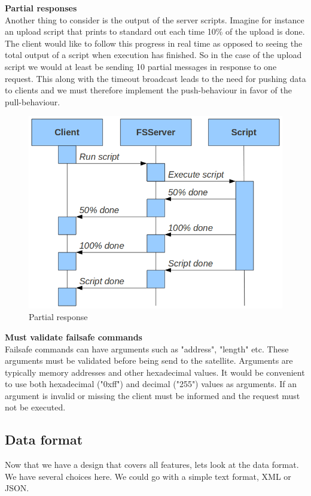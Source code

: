 \textbf{Partial responses} \\
Another thing to consider is the output of the server scripts. Imagine for instance an upload script that prints to standard out each time 10\% of the upload is done. The client would like to follow this progress in real time as opposed to seeing the total output of a script when execution has finished. So in the case of the upload script we would at least be sending 10 partial messages in response to one request.
This along with the timeout broadcast leads to the need for pushing data to clients and we must therefore implement the push-behaviour in favor of the pull-behaviour.

\begin{figure}[h!] \centering
	\includegraphics[scale=0.5]{img/partial_responses}
  \caption{Partial response}
\end{figure}

\textbf{Must validate failsafe commands} \\
Failsafe commands can have arguments such as "address", "length" etc. These arguments must be validated before being send to the satellite. Arguments are typically memory addresses and other hexadecimal values. It would be convenient to use both hexadecimal ("0xff") and decimal ("255") values as arguments. If an argument is invalid or missing the client must be informed and the request must not be executed.

\subsection{Data format}
Now that we have a design that covers all features, lets look at the data format. We have several choices here. We could go with a simple text format, XML or JSON.

